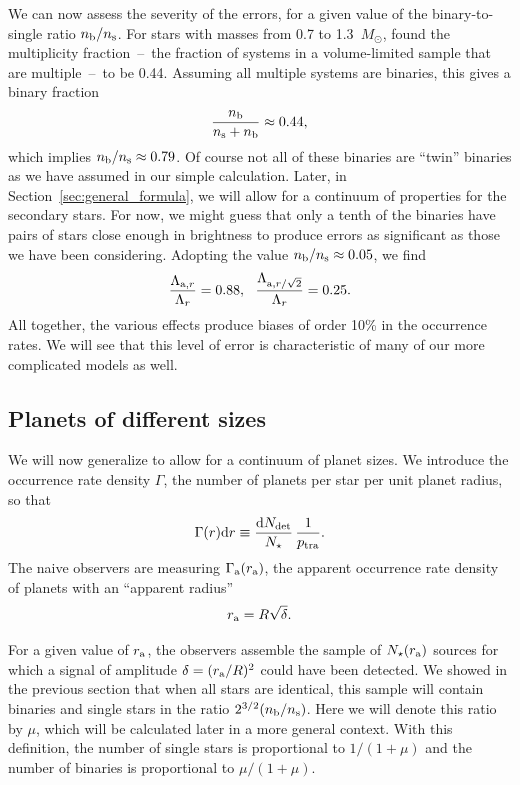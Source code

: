 \documentclass[12pt,modern]{aastex61}
\renewcommand{\a}{_{\rm a}}
\newcommand{\s}{_{\rm s}}
\renewcommand{\b}{_{\rm b}}
\begin{document}
We can now assess the severity of the errors, for a given value of the
binary-to-single ratio $n\b/n\s$. For stars with masses from 0.7 to
1.3~$M_\odot$, \citet{raghavan_survey_2010} found the multiplicity
fraction~--~the fraction of systems in a volume-limited sample that
are multiple~--~to be 0.44.  Assuming all multiple systems are
binaries, this gives a binary fraction
\begin{equation}
  \frac{n\b}{n\s + n\b} \approx 0.44,
\end{equation}
which implies $n\b/n\s \approx 0.79$.  Of course not all of these
binaries are ``twin'' binaries as we have assumed in our simple
calculation.  Later, in Section~\ref{sec:general_formula}, we will
allow for a continuum of properties for the secondary stars. For now,
we might guess that only a tenth of the binaries have pairs of stars
close enough in brightness to produce errors as significant as those
we have been considering.  Adopting the value $n\b/n\s\approx0.05$, we
find
\begin{equation}
    \frac{\Lambda_{{\rm{a}},r}}{\Lambda_r} = 0.88,~~
    \frac{\Lambda_{{\rm{a}},r/\sqrt{2}}}{\Lambda_r} = 0.25.
    \label{eq:ratios}
\end{equation}
All together, the various effects produce biases of order 10\% in the
occurrence rates.  We will see that this level of error is
characteristic of many of our more complicated models as well.

\subsection{Planets of different sizes}
\label{sec:model_1_density}

We will now generalize to allow for a continuum of planet sizes.   We
introduce the occurrence rate density $\Gamma$, the number of planets
per star per unit planet radius, so that
\begin{equation}
    \Gamma(r) {\rm d}r \equiv \frac{ {\rm d}N_{\rm det} }{N_\star}
            \, \frac{1}{p_{\rm tra}}.
    \label{eq:rate_density_defn}
\end{equation}
The naive observers are measuring $\Gamma\a(r\a)$, the apparent
occurrence rate density of planets with an ``apparent radius''
\begin{equation}
  r\a = R \sqrt{\delta}.
\end{equation}

For a given value of $r\a$, the observers assemble the sample of
$N_\star(r\a)$ sources for which a signal of amplitude $\delta =
(r\a/R)^2$ could have been detected.  We showed in the previous
section that when all stars are identical, this sample will contain
binaries and single stars in the ratio $2^{3/2}(n\b/n\s)$.  Here we
will denote this ratio by $\mu$, which will be calculated later in a
more general context.  With this definition, the number of single
stars is proportional to $1/(1+\mu)$ and the number of binaries is
proportional to $\mu/(1+\mu)$.
\end{document}
